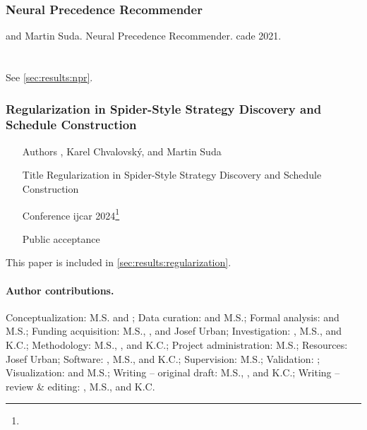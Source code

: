\subsubsection{Neural Precedence Recommender}

 and Martin Suda.
Neural Precedence Recommender.
\Acrfull{cade} 2021.
\cite{DBLP:conf/cade/Bartek021}
\\ 
\\ 
\\ See \cref{sec:results:npr}.

\subsubsection{Regularization in Spider-Style Strategy Discovery and Schedule Construction}


\begin{itemize}
\item[Authors] , Karel Chvalovský, and Martin Suda
\item[Title] Regularization in Spider-Style Strategy Discovery and Schedule Construction \cite{DBLP:conf/ijcar/BartekCS24}
\item[Conference] \Acrfull{ijcar} 2024\footnote{}
\item[Public acceptance] 
\end{itemize}

This paper is included in \cref{sec:results:regularization}.

\paragraph{Author contributions.}
Conceptualization: M.S. and ;
Data curation:  and M.S.;
Formal analysis:  and M.S.;
Funding acquisition: M.S., , and Josef Urban;
Investigation: , M.S., and K.C.;
Methodology: M.S., , and K.C.;
Project administration: M.S.;
Resources: Josef Urban;
Software: , M.S., and K.C.;
Supervision: M.S.;
Validation: ;
Visualization:  and M.S.;
Writing -- original draft: M.S., , and K.C.;
Writing -- review \& editing: , M.S., and K.C.

